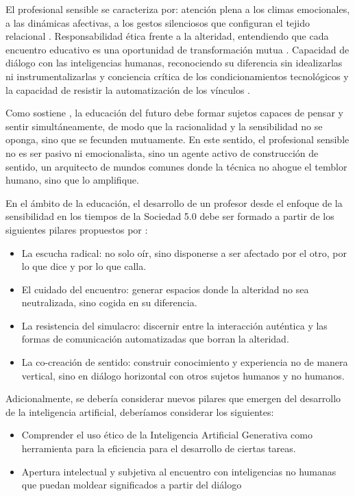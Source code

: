 \documentclass[spanish]{textolivre}
\begin{document}
El profesional sensible se caracteriza por: atención plena a los climas emocionales, a las dinámicas afectivas, a los gestos silenciosos que configuran el tejido relacional \cite{seguel2023}. Responsabilidad ética frente a la alteridad, entendiendo que cada encuentro educativo es una oportunidad de transformación mutua \cite{seguelotondo2024}. Capacidad de diálogo con las inteligencias humanas, reconociendo su diferencia sin idealizarlas ni instrumentalizarlas y conciencia crítica de los condicionamientos tecnológicos \cite{jimenezperez2023} y la capacidad de resistir la automatización de los vínculos \cite{santos2023}.

Como sostiene \textcite{puiggros2019}, la educación del futuro debe formar sujetos capaces de pensar y sentir simultáneamente, de modo que la racionalidad y la sensibilidad no se oponga, sino que se fecunden mutuamente. En este sentido, el profesional sensible no es ser pasivo ni emocionalista, sino un agente activo de construcción de sentido, un arquitecto de mundos comunes donde la técnica no ahogue el temblor humano, sino que lo amplifique.

En el ámbito de la educación, el desarrollo de un profesor desde el enfoque de la sensibilidad en los tiempos de la Sociedad 5.0 debe ser formado a partir de los siguientes pilares propuestos por \textcite{seguelotondo2024}:

\begin{itemize}
    \item La escucha radical: no solo oír, sino disponerse a ser afectado por el otro, por lo que dice y por lo que calla.
    \item El cuidado del encuentro: generar espacios donde la alteridad no sea neutralizada, sino cogida en su diferencia.
    \item La resistencia del simulacro: discernir entre la interacción auténtica y las formas de comunicación automatizadas que borran la alteridad.
    \item La co-creación de sentido: construir conocimiento y experiencia no de manera vertical, sino en diálogo horizontal con otros sujetos humanos y no humanos.
\end{itemize}

Adicionalmente, se debería considerar nuevos pilares que emergen del desarrollo de la inteligencia artificial, deberíamos considerar los siguientes:

\begin{itemize}
    \item Comprender el uso ético de la Inteligencia Artificial Generativa como herramienta para la eficiencia para el desarrollo de ciertas tareas.
    \item Apertura intelectual y subjetiva al encuentro con inteligencias no humanas que puedan moldear significados a partir del diálogo
\end{itemize}
\end{document}
